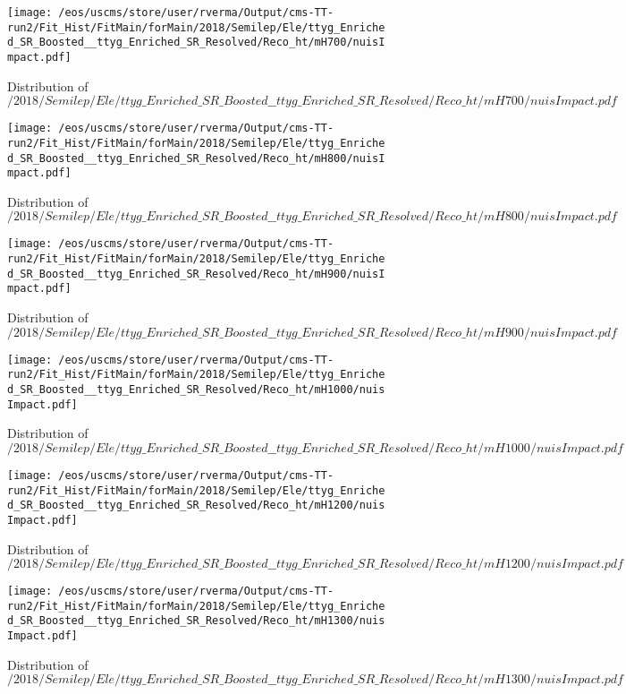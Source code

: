 \begin{figure}
\centering
\texttt{[image: /eos/uscms/store/user/rverma/Output/cms-TT-run2/Fit\_Hist/FitMain/forMain/2018/Semilep/Ele/ttyg\_Enriched\_SR\_Boosted\_\_ttyg\_Enriched\_SR\_Resolved/Reco\_ht/mH700/nuisImpact.pdf]}
\caption{Distribution of $/2018/Semilep/Ele/ttyg\_Enriched\_SR\_Boosted\_\_ttyg\_Enriched\_SR\_Resolved/Reco\_ht/mH700/nuisImpact.pdf$}
\end{figure}

\begin{figure}
\centering
\texttt{[image: /eos/uscms/store/user/rverma/Output/cms-TT-run2/Fit\_Hist/FitMain/forMain/2018/Semilep/Ele/ttyg\_Enriched\_SR\_Boosted\_\_ttyg\_Enriched\_SR\_Resolved/Reco\_ht/mH800/nuisImpact.pdf]}
\caption{Distribution of $/2018/Semilep/Ele/ttyg\_Enriched\_SR\_Boosted\_\_ttyg\_Enriched\_SR\_Resolved/Reco\_ht/mH800/nuisImpact.pdf$}
\end{figure}

\begin{figure}
\centering
\texttt{[image: /eos/uscms/store/user/rverma/Output/cms-TT-run2/Fit\_Hist/FitMain/forMain/2018/Semilep/Ele/ttyg\_Enriched\_SR\_Boosted\_\_ttyg\_Enriched\_SR\_Resolved/Reco\_ht/mH900/nuisImpact.pdf]}
\caption{Distribution of $/2018/Semilep/Ele/ttyg\_Enriched\_SR\_Boosted\_\_ttyg\_Enriched\_SR\_Resolved/Reco\_ht/mH900/nuisImpact.pdf$}
\end{figure}

\begin{figure}
\centering
\texttt{[image: /eos/uscms/store/user/rverma/Output/cms-TT-run2/Fit\_Hist/FitMain/forMain/2018/Semilep/Ele/ttyg\_Enriched\_SR\_Boosted\_\_ttyg\_Enriched\_SR\_Resolved/Reco\_ht/mH1000/nuisImpact.pdf]}
\caption{Distribution of $/2018/Semilep/Ele/ttyg\_Enriched\_SR\_Boosted\_\_ttyg\_Enriched\_SR\_Resolved/Reco\_ht/mH1000/nuisImpact.pdf$}
\end{figure}

\begin{figure}
\centering
\texttt{[image: /eos/uscms/store/user/rverma/Output/cms-TT-run2/Fit\_Hist/FitMain/forMain/2018/Semilep/Ele/ttyg\_Enriched\_SR\_Boosted\_\_ttyg\_Enriched\_SR\_Resolved/Reco\_ht/mH1200/nuisImpact.pdf]}
\caption{Distribution of $/2018/Semilep/Ele/ttyg\_Enriched\_SR\_Boosted\_\_ttyg\_Enriched\_SR\_Resolved/Reco\_ht/mH1200/nuisImpact.pdf$}
\end{figure}

\begin{figure}
\centering
\texttt{[image: /eos/uscms/store/user/rverma/Output/cms-TT-run2/Fit\_Hist/FitMain/forMain/2018/Semilep/Ele/ttyg\_Enriched\_SR\_Boosted\_\_ttyg\_Enriched\_SR\_Resolved/Reco\_ht/mH1300/nuisImpact.pdf]}
\caption{Distribution of $/2018/Semilep/Ele/ttyg\_Enriched\_SR\_Boosted\_\_ttyg\_Enriched\_SR\_Resolved/Reco\_ht/mH1300/nuisImpact.pdf$}
\end{figure}

